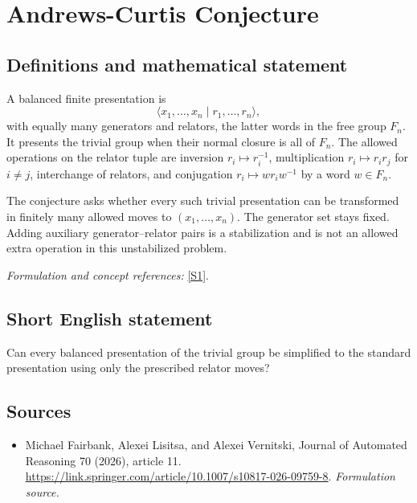 \documentclass[11pt]{article}
\begin{document}
\section*{\texorpdfstring{Andrews-Curtis Conjecture}{Andrews-Curtis Conjecture}}\label{1108}
\subsection{Definitions and mathematical statement}
A balanced finite presentation is
\[
 \langle x_1,\ldots,x_n\mid r_1,\ldots,r_n\rangle,
\]
with equally many generators and relators, the latter words in the free group $F_n$. It presents the trivial group when their normal closure is all of $F_n$. The allowed operations on the relator tuple are inversion $r_i\mapsto r_i^{-1}$, multiplication $r_i\mapsto r_ir_j$ for $i\ne j$, interchange of relators, and conjugation $r_i\mapsto w r_iw^{-1}$ by a word $w\in F_n$.

The conjecture asks whether every such trivial presentation can be transformed in finitely many allowed moves to $(x_1,\ldots,x_n)$. The generator set stays fixed. Adding auxiliary generator--relator pairs is a stabilization and is not an allowed extra operation in this unstabilized problem.
\par\smallskip\textit{Formulation and concept references:} \href{https://link.springer.com/article/10.1007/s10817-026-09759-8}{[S1]}.

\subsection{Short English statement}
Can every balanced presentation of the trivial group be simplified to the standard presentation using only the prescribed relator moves?
\subsection{Sources}
\begin{itemize}
\item[S1]Michael Fairbank, Alexei Lisitsa, and Alexei Vernitski, Journal of Automated Reasoning 70 (2026), article 11.
\url{https://link.springer.com/article/10.1007/s10817-026-09759-8}.
\textit{Formulation source.}
\end{itemize}
\end{document}
